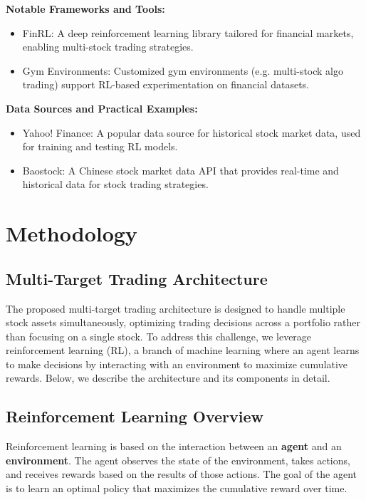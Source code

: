 \documentclass[conference]{IEEEtran}
\begin{document}
\textbf{Notable Frameworks and Tools:}
\begin{itemize}
    \item FinRL: A deep reinforcement learning library tailored for financial markets, enabling multi-stock trading strategies.
    \item Gym Environments: Customized gym environments (e.g. multi-stock algo trading) support RL-based experimentation on financial datasets.
\end{itemize}

\textbf{Data Sources and Practical Examples:}
\begin{itemize}
    \item Yahoo! Finance: A popular data source for historical stock market data, used for training and testing RL models.
    \item Baostock: A Chinese stock market data API that provides real-time and historical data for stock trading strategies.
\end{itemize}

\section{Methodology}

\subsection{Multi-Target Trading Architecture}


The proposed multi-target trading architecture is designed to handle multiple stock assets simultaneously, optimizing trading decisions across a portfolio rather than focusing on a single stock. To address this challenge, we leverage reinforcement learning (RL), a branch of machine learning where an agent learns to make decisions by interacting with an environment to maximize cumulative rewards. Below, we describe the architecture and its components in detail.

\subsection{Reinforcement Learning Overview}

Reinforcement learning is based on the interaction between an \textbf{agent} and an \textbf{environment}. The agent observes the state of the environment, takes actions, and receives rewards based on the results of those actions. The goal of the agent is to learn an optimal policy that maximizes the cumulative reward over time.
\end{document}
